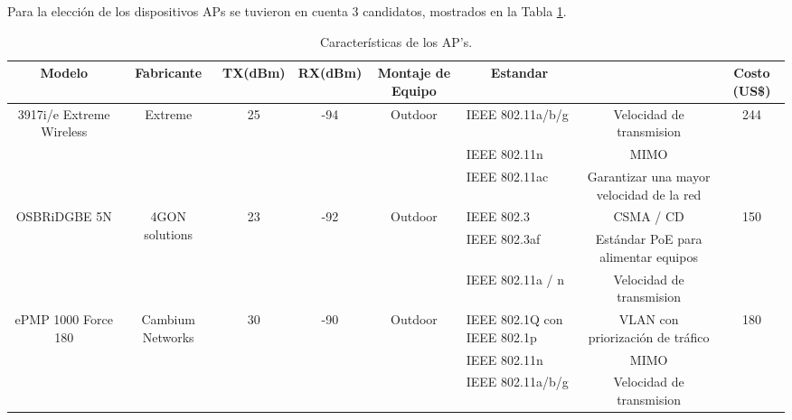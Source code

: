Para la elección de los dispositivos APs se tuvieron en cuenta 3 candidatos, mostrados en la Tabla \ref{tab:caracteristicas-aps}.

\begin{table}[H]
  \tiny
  \centering
    \begin{tabular}{|c|c|c|c|c|l|c|c|}
    \hline
    \rowcolor[rgb]{ .773,  .851,  .945} \textbf{Modelo} & \textbf{Fabricante} & \textbf{TX(dBm)} & \textbf{RX(dBm)} & \textbf{Montaje de Equipo} & \multicolumn{1}{c|}{\textbf{Estandar}} &       & \textbf{Costo (US\$)} \bigstrut\\
    \hline
    \multirow{3}[6]{*}{3917i/e Extreme Wireless} & \multirow{3}[6]{*}{Extreme} & \multirow{3}[6]{*}{25} & \multirow{3}[6]{*}{-94} & \multirow{3}[6]{*}{Outdoor} & IEEE 802.11a/b/g & Velocidad de transmision   & \multirow{3}[6]{*}{244} \bigstrut\\
\cline{6-7}          &       &       &       &       & IEEE 802.11n & MIMO  &  \bigstrut\\
\cline{6-7}          &       &       &       &       & IEEE 802.11ac & \textcolor[rgb]{ .125,  .129,  .141}{Garantizar una mayor velocidad de la red} &  \bigstrut\\
    \hline
    \multirow{3}[6]{*}{OSBRiDGBE 5N} & \multirow{3}[6]{*}{4GON solutions} & \multirow{3}[6]{*}{23} & \multirow{3}[6]{*}{-92} & \multirow{3}[6]{*}{Outdoor} & IEEE 802.3 & CSMA / CD & \multirow{3}[6]{*}{150} \bigstrut\\
\cline{6-7}          &       &       &       &       & IEEE 802.3af & Estándar PoE para alimentar equipos &  \bigstrut\\
\cline{6-7}          &       &       &       &       & IEEE 802.11a / n & Velocidad de transmision &  \bigstrut\\
    \hline
    \multirow{3}[6]{*}{ePMP 1000 Force 180} & \multirow{3}[6]{*}{Cambium Networks} & \multirow{3}[6]{*}{30} & \multirow{3}[6]{*}{-90} & \multirow{3}[6]{*}{Outdoor} & IEEE 802.1Q con IEEE 802.1p & VLAN con priorización de tráfico  & \multirow{3}[6]{*}{180} \bigstrut\\
\cline{6-7}          &       &       &       &       & IEEE 802.11n & MIMO  &  \bigstrut\\
\cline{6-7}          &       &       &       &       & IEEE 802.11a/b/g & Velocidad de transmision  &  \bigstrut\\
    \hline
    \end{tabular}%
	\caption{Características de los AP's.}
  \label{tab:caracteristicas-aps}%
\end{table}%


